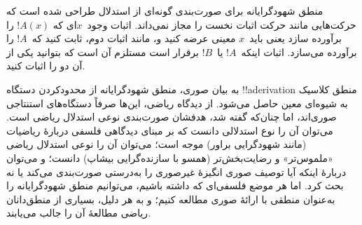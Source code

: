 \documentclass[../../../include/open-logic-section]{subfiles}
\begin{document}
منطق شهودگرایانه برای صورت‌بندی گونه‌ای از استدلال طراحی شده است که
حرکت‌هایی مانند حرکت اثبات نخست را مجاز نمی‌داند. اثبات وجود~$x$ای که
$!A(x)$ را برآورده سازد یعنی باید~$x$ معینی عرضه کنید و، مانند اثبات
دوم، ثابت کنید که~$!A$ را برآورده می‌سازد. اثبات اینکه~$!A$ یا~$!B$
برقرار است مستلزم آن است که بتوانید یکی از آن دو را اثبات کنید.

به بیان صوری، منطق شهودگرایانه از محدودکردن دستگاه
!!a{derivation} منطق کلاسیک به شیوه‌ای معین حاصل می‌شود. از دیدگاه
ریاضی، این‌ها صرفاً دستگاه‌های استنتاجی صوری‌اند، اما چنان‌که گفته شد،
هدفشان صورت‌بندی نوعی استدلال ریاضی است. می‌توان آن را نوع استدلالی
دانست که بر مبنای دیدگاهی فلسفی دربارهٔ ریاضیات (مانند شهودگرایی
براور) موجه است؛ می‌توان آن را نوعی استدلال ریاضی «ملموس‌تر» و
رضایت‌بخش‌تر (همسو با سازنده‌گرایی بیشاپ) دانست؛ و می‌توان دربارهٔ اینکه
آیا توصیف صوری انگیزهٔ غیرصوری را به‌درستی صورت‌بندی می‌کند یا نه بحث
کرد. اما هر موضع فلسفی‌ای که داشته باشیم، می‌توانیم منطق شهودگرایانه را
به‌عنوان منطقی با ارائهٔ صوری مطالعه کنیم؛ و به هر دلیل، بسیاری از
منطق‌دانان ریاضی مطالعهٔ آن را جالب می‌یابند.
\end{document}
